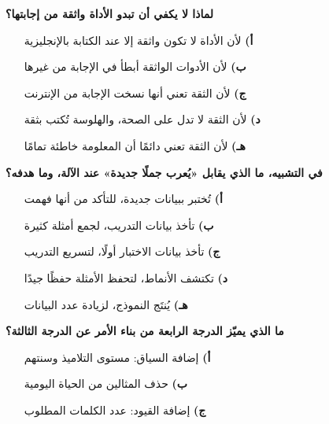 \documentclass[11pt,a4paper]{article}
\begin{document}
\begin{multicols}{2}
\begin{minipage}{\linewidth}
\hangindent=0.7cm\textbf{لماذا لا يكفي أن تبدو الأداة واثقة من إجابتها؟}
\begin{itemize}[leftmargin=0.95cm, labelsep=4pt, itemsep=0pt, topsep=2pt, parsep=0pt]
  \item[\textbf{أ)}] لأن الأداة لا تكون واثقة إلا عند الكتابة بالإنجليزية
  \item[\textbf{ب)}] لأن الأدوات الواثقة أبطأ في الإجابة من غيرها
  \item[\textbf{ج)}] لأن الثقة تعني أنها نسخت الإجابة من الإنترنت
  \item[\textbf{د)}] لأن الثقة لا تدل على الصحة، والهلوسة تُكتب بثقة
  \item[\textbf{هـ)}] لأن الثقة تعني دائمًا أن المعلومة خاطئة تمامًا
\end{itemize}
\end{minipage}\par\vspace{7pt plus 4pt}
\noindent\begin{minipage}{\linewidth}
\hangindent=0.7cm\textbf{في التشبيه، ما الذي يقابل «يُعرب جملًا جديدة» عند الآلة، وما هدفه؟}
\begin{itemize}[leftmargin=0.95cm, labelsep=4pt, itemsep=0pt, topsep=2pt, parsep=0pt]
  \item[\textbf{أ)}] تُختبر ببيانات جديدة، للتأكد من أنها فهمت
  \item[\textbf{ب)}] تأخذ بيانات التدريب، لجمع أمثلة كثيرة
  \item[\textbf{ج)}] تأخذ بيانات الاختبار أولًا، لتسريع التدريب
  \item[\textbf{د)}] تكتشف الأنماط، لتحفظ الأمثلة حفظًا جيدًا
  \item[\textbf{هـ)}] يُنتَج النموذج، لزيادة عدد البيانات
\end{itemize}
\end{minipage}\par\vspace{7pt plus 4pt}
\noindent\begin{minipage}{\linewidth}
\hangindent=0.7cm\textbf{ما الذي يميّز الدرجة الرابعة من بناء الأمر عن الدرجة الثالثة؟}
\begin{itemize}[leftmargin=0.95cm, labelsep=4pt, itemsep=0pt, topsep=2pt, parsep=0pt]
  \item[\textbf{أ)}] إضافة السياق: مستوى التلاميذ وسنتهم
  \item[\textbf{ب)}] حذف المثالين من الحياة اليومية
  \item[\textbf{ج)}] إضافة القيود: عدد الكلمات المطلوب

\end{itemize}
\end{minipage}
\end{multicols}
\end{document}
